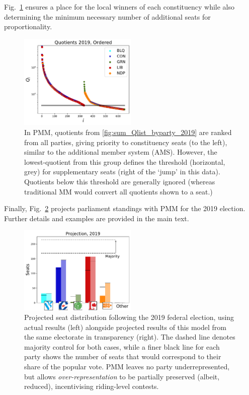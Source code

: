 Fig.~\ref{fig:sum_Qlist_ordered_2019} ensures a place for the local winners of each constituency while also determining the minimum necessary number of additional seats for proportionality.
\begin{figure}
\includegraphics[width=0.50\textwidth,clip]{PR_calcs/data/raw_2019/PMM_out/PMM_Qlist_all.pdf}
\caption{ In PMM, quotients from \ref{fig:sum_Qlist_byparty_2019} are ranked from all parties, giving priority to constituency seats (to the left), similar to the additional member system (AMS). However, the lowest-quotient from this group defines the threshold (horizontal, grey) for supplementary seats (right of the `jump' in this data). Quotients below this threshold are generally ignored (whereas traditional MM would convert all quotients shown to a seat.)}
\label{fig:sum_Qlist_ordered_2019}
\end{figure}
Finally, Fig.~\ref{fig:sum_projection_2019} projects parliament standings with PMM for the 2019 election. Further details and examples are provided in the main text.

\begin{figure}
  \includegraphics[width=0.50\textwidth,clip]{PR_calcs/data/raw_2019/PMM_out/PMM_projections.pdf}
  \caption{Projected seat distribution following the 2019 federal election, using actual results (left) alongside projected results of this model from the same electorate in transparency (right). The dashed line denotes majority control for both cases, while a finer black line for each party shows the number of seats that would correspond to their share of the popular vote. PMM leaves no party underrepresented, but allows \emph{over-representation} to be partially preserved (albeit, reduced), incentivising riding-level contests.}
\label{fig:sum_projection_2019}
\end{figure}
